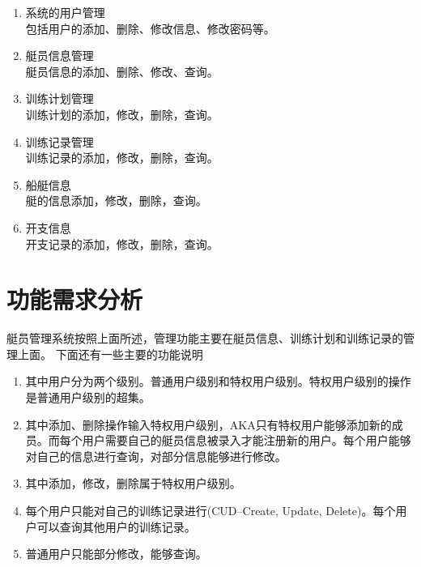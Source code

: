 \begin{enumerate}
\item
  {系统的用户管理\\
    包括用户的添加、删除、修改信息、修改密码等。}

\item{艇员信息管理\\
    艇员信息的添加、删除、修改、查询。
  }

\item{训练计划管理\\
    训练计划的添加，修改，删除，查询。
  }

\item {训练记录管理\\
    训练记录的添加，修改，删除，查询。
  }

\item {船艇信息\\
    艇的信息添加，修改，删除，查询。
  }

\item {开支信息\\
    开支记录的添加，修改，删除，查询。
  }

\end{enumerate}






\section{功能需求分析}
艇员管理系统按照上面所述，管理功能主要在艇员信息、训练计划和训练记录的管理上面。
下面还有一些主要的功能说明
\begin{enumerate}
\item{其中用户分为两个级别。普通用户级别和特权用户级别。特权用户级别的操作是普通用户级别的超集。}

\item{其中添加、删除操作输入特权用户级别，AKA只有特权用户能够添加新的成员。而每个用户需要自己的艇员信息被录入才能注册新的用户。每个用户能够对自己的信息进行查询，对部分信息能够进行修改。}

\item{其中添加，修改，删除属于特权用户级别。}

\item{每个用户只能对自己的训练记录进行(CUD--Create, Update, Delete)。每个用户可以查询其他用户的训练记录。}

\item{普通用户只能部分修改，能够查询。}
\end{enumerate}


